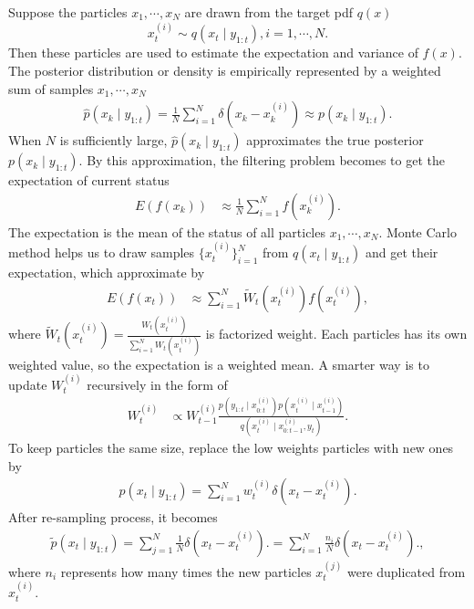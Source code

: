 Suppose the particles $x_1, \cdots, x_N$ are drawn from the target pdf $q(x)$
\begin{equation}\label{sampling}
x_t^{(i)} \sim q(x_t \mid  y_{1:t}), i = 1, \cdots, N.
\end{equation}
Then these particles are used to estimate the expectation and variance of $f(x)$. The posterior distribution or density is empirically represented by a weighted sum of samples $x_1, \cdots, x_N$ 
\begin{align*}
\hat{p}(x_k\mid y_{1:t})=\frac{1}{N}\sum_{i=1}^N\delta (x_k-x_k^{(i)})\approx p(x_k\mid y_{1:t}).
\end{align*}
When $N$ is sufficiently large, $\hat{p}(x_k\mid y_{1:t})$ approximates the true posterior $p(x_k\mid y_{1:t})$. By this approximation, the filtering problem becomes to get the expectation of current status
\begin{align*}
E(f(x_k)) &\approx \frac{1}{N}\sum_{i=1}^Nf(x_k^{(i)}).
\end{align*}
The expectation is the mean of the status of all particles $x_1, \cdots, x_N$. Monte Carlo method helps us to draw samples $\{x_t^{(i)}\}_{i=1}^N$ from $q(x_t\mid y_{1:t})$ and get their expectation, which approximate by
\begin{align*}
E(f(x_t)) &\approx \sum_{i=1}^{N} \tilde{W}_t(x_t^{(i)})f(x_t^{(i)}),
\end{align*}
where $\tilde{W}_t(x_t^{(i)}) = \frac{ W_t(x_t^{(i)})}{\sum_{i=1}^NW_t(x_t^{(i)})}$ is factorized weight. Each particles has its own weighted value, so the expectation is a weighted mean. A smarter way is to update $W_t^{(i)}$ recursively in the form of
\begin{align*}
W_t^{(i)} &\propto W_{t-1}^{(i)} \frac{ p(y_{1:t}\mid x_{0:t}^{(i)}) p(x_{t}^{(i)}\mid x_{t-1}^{(i)}) }   {q(x_{t}^{(i)}\mid x_{0:t-1}^{(i)},y_{t})}.
\end{align*}
To keep particles the same size, replace the low weights particles with new ones by 
\begin{align*}
p(x_t\mid y_{1:t})=\sum_{i=1}^Nw_t^{(i)} \delta (x_t-x_t^{(i)}).
\end{align*}
After re-sampling process, it becomes
\begin{align*}
\tilde{p}(x_t\mid y_{1:t})=\sum_{j=1}^N\frac{1}{N} \delta (x_t-x_t^{(i)}).= \sum_{i=1}^N\frac{n_i}{N}\delta (x_t-x_t^{(i)}).,
\end{align*}
where $n_i$ represents how many times the new particles $x_t^{(j)}$ were duplicated from $x_t^{(i)}$. 

